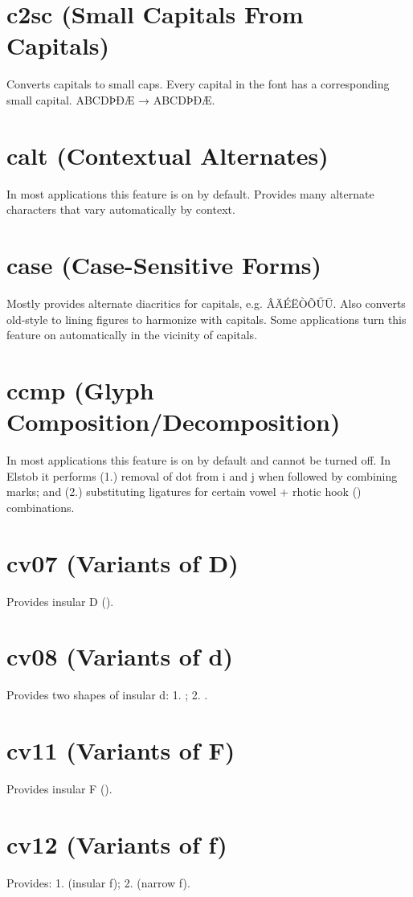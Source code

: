 \documentclass[12pt,letterpaper,openany]{book}
\begin{document}
\section{c2sc (Small Capitals From Capitals)}
Converts capitals to small caps. Every capital in the font has a corresponding
small capital. ABCDÞÐÆ → { ABCDÞÐÆ}.

\section{calt (Contextual Alternates)}
In most applications this feature is on by default.
Provides many alternate characters that vary automatically by context.

\section{case (Case-Sensitive Forms)}
Mostly provides alternate diacritics for capitals, e.g. ÂÄÉËÒÕŰŪ. Also converts
old-style to lining figures to harmonize with capitals. Some applications turn
this feature on automatically in the vicinity of capitals.

\section{ccmp (Glyph Composition/Decomposition)}
In most applications this feature is on by default and cannot be turned off.
In Elstob it performs (1.) removal of dot from i and j when followed by combining
marks; and (2.) substituting ligatures for certain vowel + rhotic hook ()
combinations.

\section{cv07 (Variants of D)}
Provides insular D ().

\section{cv08 (Variants of d)}
Provides two shapes of insular d: 1. ; 2. .

\section{cv11 (Variants of F)}
Provides insular F ().

\section{cv12 (Variants of f)}
Provides: 1.  (insular f); 2.  (narrow f).
\end{document}

